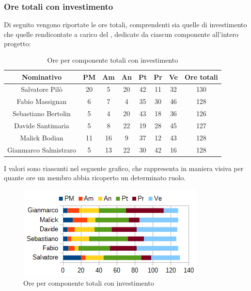 		\subsubsection{Ore totali con investimento}
		Di seguito vengono riportate le ore totali, comprendenti sia quelle di investimento che quelle rendicontate a carico del , dedicate da ciascun componente all'intero progetto: \\
		\begin{table}[H]
		\centering
		\begin{tabular}{|c|c|c|c|c|c|c|c|}
			\hline
			\textbf{Nominativo}		& \textbf{PM}	& \textbf{Am}	& \textbf{An}	& \textbf{Pt}	& \textbf{Pr}	& \textbf{Ve}	& \textbf{Ore totali}     \\
			\hline
			Salvatore Pilò			& 20	& 5		& 20	& 42	& 11	& 32	& 130 \\
			Fabio Massignan			& 6		& 7		& 4		& 35	& 30	& 46	& 128 \\
			Sebastiano Bertolin		& 5		& 4		& 20	& 43	& 18	& 36	& 126 \\
			Davide Santimaria		& 5		& 8		& 22	& 19	& 28	& 45	& 127 \\
			Malick Bodian			& 11	& 16	& 9		& 37	& 12	& 43	& 128 \\
			Gianmarco Salmistraro	& 5		& 13	& 22	& 30	& 42	& 16	& 128 \\
			\hline
		\end{tabular}
		\caption{Ore per componente totali con investimento}
		\end{table}
		I valori sono riassunti nel seguente grafico, che rappresenta in maniera visiva per quante ore un membro abbia ricoperto un determinato ruolo. \\
		\begin{figure}[H]
			\centering
			\includegraphics[scale=1]{immagini/grafici/riepilogo_conclusivo-barra.png}
			\caption{Ore per componente totali con investimento}
		\end{figure}
